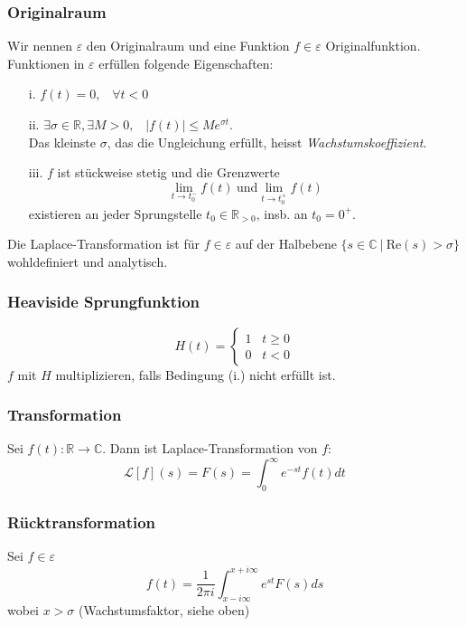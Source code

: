\documentclass[8pt, a4paper, landscape, fleqn]{scrartcl}
\def\R{\mathbb{R}}
\def\C{\mathbb{C}}
\def\Re{\text{Re}}
\begin{document}
\begin{multicols*}{3}
		\subsubsection{Originalraum}
		Wir nennen $\varepsilon$ den Originalraum und eine Funktion $f\in\varepsilon$ Originalfunktion. Funktionen in $\varepsilon$ erfüllen folgende Eigenschaften:
		\begin{itemize}
		    \item[i.] $f(t) = 0, \hspace{10pt} \forall t<0$
		    \item[ii.] $\exists \sigma \in \R, \exists M>0, \hspace{10pt} |f(t)| \leq Me^{\sigma t}$.\\ Das kleinste $\sigma$, das die Ungleichung erfüllt, heisst \textit{Wachstumskoeffizient}.
		    \item[iii.] $f$ ist stückweise stetig und die Grenzwerte
		    $$ \lim_{t\rightarrow t_0^-}f(t) \hspace{3pt} \text{und} \lim_{t\rightarrow t_0^+}f(t)$$
		    existieren an jeder Sprungstelle $t_0\in \R_{>0}$, insb. an $t_0 = 0^+$.
		\end{itemize}
		Die Laplace-Transformation ist für $f\in \varepsilon$ auf der Halbebene $\{s\in \C \ | \ \Re(s) > \sigma\}$ wohldefiniert und analytisch.
		
		\subsubsection{Heaviside Sprungfunktion}
		\begin{equation*}
		    H(t) =
		    \begin{cases}
    		    1 \hspace{10pt} t \geq 0 \\
    		    0 \hspace{10pt} t < 0
		    \end{cases}
		\end{equation*}
		$f$ mit $H$ multiplizieren, falls Bedingung (i.) nicht erfüllt ist.
		
		\subsubsection{Transformation}
		Sei $f(t) : \R \to \C$. Dann ist Laplace-Transformation von $f$:
		$$ \mathcal{L}[f](s) = F(s) = \int_0^\infty e^{-st} f(t) dt $$
		
		\subsubsection{Rücktransformation}
		Sei $f\in \varepsilon$
		$$ f(t) = \frac{1}{2\pi i} \int_{x-i\infty}^{x+i\infty} e^{st}F(s)ds$$ 
		wobei $x > \sigma$ (Wachstumsfaktor, siehe oben)
		

\end{multicols*}
\end{document}
